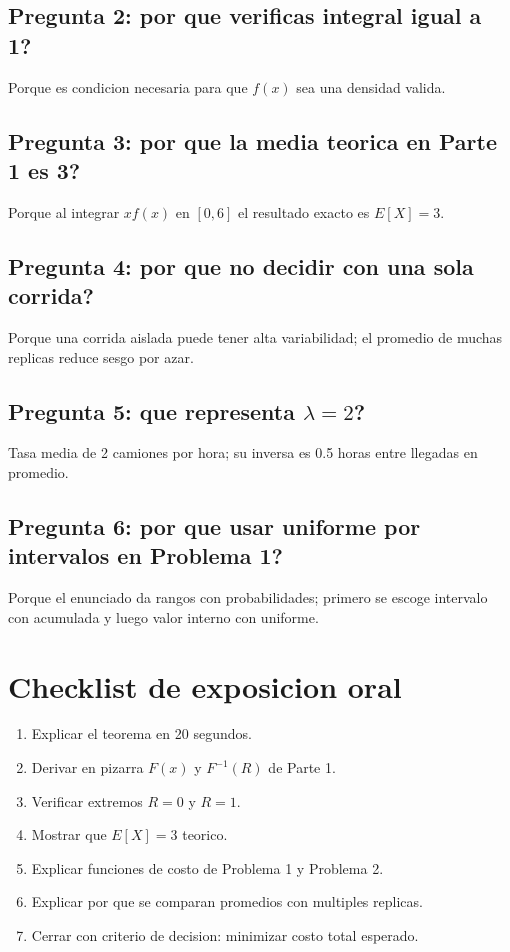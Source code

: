 \documentclass[12pt,a4paper]{article}
\begin{document}
\subsection*{Pregunta 2: por que verificas integral igual a 1?}
Porque es condicion necesaria para que $f(x)$ sea una densidad valida.

\subsection*{Pregunta 3: por que la media teorica en Parte 1 es 3?}
Porque al integrar $x f(x)$ en $[0,6]$ el resultado exacto es $E[X]=3$.

\subsection*{Pregunta 4: por que no decidir con una sola corrida?}
Porque una corrida aislada puede tener alta variabilidad; el promedio de muchas replicas reduce sesgo por azar.

\subsection*{Pregunta 5: que representa $\lambda=2$?}
Tasa media de 2 camiones por hora; su inversa es 0.5 horas entre llegadas en promedio.

\subsection*{Pregunta 6: por que usar uniforme por intervalos en Problema 1?}
Porque el enunciado da rangos con probabilidades; primero se escoge intervalo con acumulada y luego valor interno con uniforme.

\section{Checklist de exposicion oral}
\begin{enumerate}
  \item Explicar el teorema en 20 segundos.
  \item Derivar en pizarra $F(x)$ y $F^{-1}(R)$ de Parte 1.
  \item Verificar extremos $R=0$ y $R=1$.
  \item Mostrar que $E[X]=3$ teorico.
  \item Explicar funciones de costo de Problema 1 y Problema 2.
  \item Explicar por que se comparan promedios con multiples replicas.
  \item Cerrar con criterio de decision: minimizar costo total esperado.
\end{enumerate}
\end{document}
